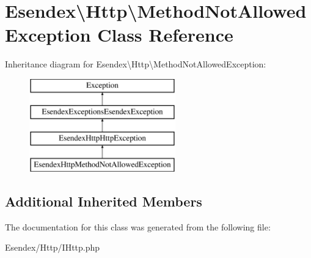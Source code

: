 \section{Esendex\textbackslash{}Http\textbackslash{}Method\-Not\-Allowed\-Exception Class Reference}
\label{class_esendex_1_1_http_1_1_method_not_allowed_exception}
Inheritance diagram for Esendex\textbackslash{}Http\textbackslash{}Method\-Not\-Allowed\-Exception\-:\begin{figure}[H]
\begin{center}
\leavevmode
\includegraphics[height=4.000000cm]{class_esendex_1_1_http_1_1_method_not_allowed_exception}
\end{center}
\end{figure}
\subsection*{Additional Inherited Members}


The documentation for this class was generated from the following file\-:\begin{DoxyCompactItemize}
\item 
Esendex/\-Http/I\-Http.\-php\end{DoxyCompactItemize}
